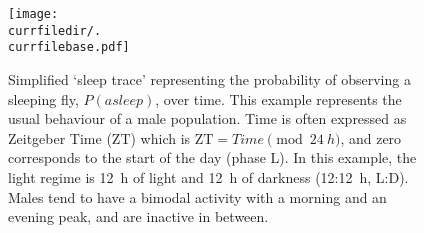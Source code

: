 \begin{figure}[h!]
  \centering   
   \texttt{[image: \\currfiledir/.\\currfilebase.pdf]}
  \caption[Example of sleep-time visualisation]{
	Simplified `sleep trace' representing the probability of observing a sleeping fly, $P(asleep)$, over time.
	This example represents the usual behaviour of a male population.
	Time is often expressed as Zeitgeber Time (ZT) which is $\text{ZT} = Time \pmod{24~h}$, and zero corresponds to the start of the day (phase L).
	In this example, the light regime is 12~h of light and 12~h of darkness (12:12~h, L:D).
	Males tend to have a bimodal activity  with a morning and an evening peak, and are inactive in between.
  \label{fig:\currfilebase}
  }
\end{figure}





